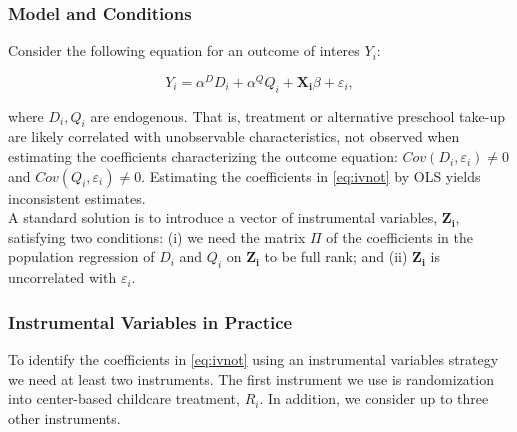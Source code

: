 \begin{appendices}
\subsubsection{Model and Conditions}

\noindent Consider the following equation for an outcome of interes $Y_{i}$:


\begin{equation}
Y_i = \alpha^D D_i + \alpha^Q Q_i + \mathbf{X_i} \beta + \varepsilon_i,
\label{eq:ivnot}
\end{equation}

\noindent where $D_{i}, Q_{i}$ are endogenous. That is, treatment or alternative preschool take-up are likely correlated with unobservable characteristics, not observed when estimating the coefficients characterizing the outcome equation: $Cov(D_i,\varepsilon_i) \neq 0$ and $Cov(Q_i,\varepsilon_i) \neq 0$. Estimating the coefficients in \eqref{eq:ivnot} by OLS yields inconsistent estimates.\\

\noindent A standard solution is to introduce a vector of instrumental variables, $\mathbf{Z_i}$, satisfying two conditions: (i) we need the matrix $\Pi$ of the coefficients in the population regression of $D_i$ and $Q_i$ on $\mathbf{Z_i}$ to be full rank; and (ii) $\mathbf{Z_i}$ is uncorrelated with $\varepsilon_i$.


\subsubsection{Instrumental Variables in Practice}

\noindent To identify the coefficients in \eqref{eq:ivnot} using an instrumental variables strategy we need at least two instruments. The first instrument we use is randomization into center-based childcare treatment, $R_i$. In addition, we consider up to three other instruments.


\end{appendices}
